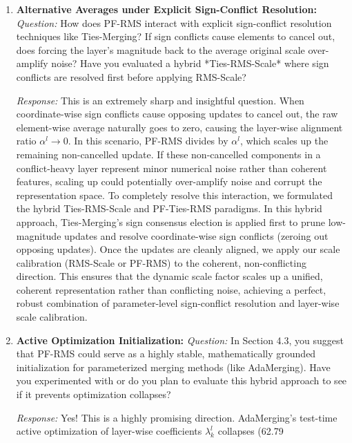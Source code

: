\documentclass{article}
\theoremstyle{plain}
\theoremstyle{definition}
\theoremstyle{remark}
\begin{document}
\begin{enumerate}
    \item \textbf{Alternative Averages under Explicit Sign-Conflict Resolution:}
    \textit{Question:} How does PF-RMS interact with explicit sign-conflict resolution techniques like Ties-Merging? If sign conflicts cause elements to cancel out, does forcing the layer's magnitude back to the average original scale over-amplify noise? Have you evaluated a hybrid *Ties-RMS-Scale* where sign conflicts are resolved first before applying RMS-Scale?
    
    \textit{Response:} This is an extremely sharp and insightful question. When coordinate-wise sign conflicts cause opposing updates to cancel out, the raw element-wise average naturally goes to zero, causing the layer-wise alignment ratio $\alpha^l \to 0$. In this scenario, PF-RMS divides by $\alpha^l$, which scales up the remaining non-cancelled update. If these non-cancelled components in a conflict-heavy layer represent minor numerical noise rather than coherent features, scaling up could potentially over-amplify noise and corrupt the representation space. To completely resolve this interaction, we formulated the hybrid Ties-RMS-Scale and PF-Ties-RMS paradigms. In this hybrid approach, Ties-Merging's sign consensus election is applied first to prune low-magnitude updates and resolve coordinate-wise sign conflicts (zeroing out opposing updates). Once the updates are cleanly aligned, we apply our scale calibration (RMS-Scale or PF-RMS) to the coherent, non-conflicting direction. This ensures that the dynamic scale factor scales up a unified, coherent representation rather than conflicting noise, achieving a perfect, robust combination of parameter-level sign-conflict resolution and layer-wise scale calibration.
    
    \item \textbf{Active Optimization Initialization:}
    \textit{Question:} In Section 4.3, you suggest that PF-RMS could serve as a highly stable, mathematically grounded initialization for parameterized merging methods (like AdaMerging). Have you experimented with or do you plan to evaluate this hybrid approach to see if it prevents optimization collapses?
    
    \textit{Response:} Yes! This is a highly promising direction. AdaMerging's test-time active optimization of layer-wise coefficients $\lambda_k^l$ collapses (62.79%
\end{enumerate}
\end{document}
